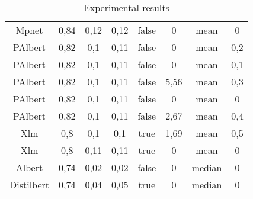 \documentclass[\main/main.tex]{subfiles}
\begin{document}
\begin{table}[H]
{\begin{tabular}{||c|c|c|c|c|c|c|c||}
Mpnet                 & 0,84 & 0,12  & 0,12  & false & 0     & mean   & 0   \\
PAlbert          & 0,82 & 0,1   & 0,11  & false & 0     & mean   & 0,2 \\
PAlbert          & 0,82 & 0,1   & 0,11  & false & 0     & mean   & 0,1 \\
PAlbert          & 0,82 & 0,1   & 0,11  & false & 5,56  & mean   & 0,3 \\
PAlbert          & 0,82 & 0,1   & 0,11  & false & 0     & mean   & 0   \\
PAlbert          & 0,82 & 0,1   & 0,11  & false & 2,67  & mean   & 0,4 \\
Xlm    & 0,8  & 0,1   & 0,1   & true  & 1,69  & mean   & 0,5 \\
Xlm    & 0,8  & 0,11  & 0,11  & true  & 0     & mean   & 0   \\
Albert                    & 0,74 & 0,02  & 0,02  & false & 0     & median & 0   \\
Distilbert & 0,74 & 0,04  & 0,05  & true  & 0     & median & 0   \\
\hline
\end{tabular}
}
\caption{Experimental results}
\label{tab:experimental_results_complete}
\end{table}
\end{document}
